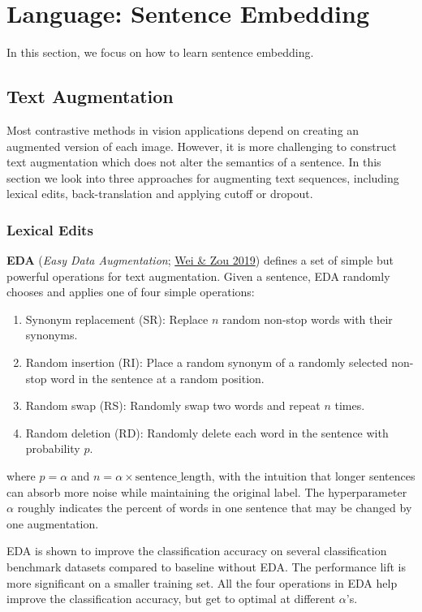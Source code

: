 \documentclass[12pt]{article}
\begin{document}
\section{Language: Sentence Embedding}

In this section, we focus on how to learn sentence embedding.

\subsection{Text Augmentation}

Most contrastive methods in vision applications depend on creating an augmented version of each image. However, it is more challenging to construct text augmentation which does not alter the semantics of a sentence. In this section we look into three approaches for augmenting text sequences, including lexical edits, back-translation and applying cutoff or dropout.

\subsubsection{Lexical Edits}
\textbf{EDA} (\emph{Easy Data Augmentation}; \href{https://arxiv.org/abs/1901.11196}{Wei \& Zou 2019}) defines a set of simple but powerful operations for text augmentation. Given a sentence, EDA randomly chooses and applies one of four simple operations:
\begin{enumerate}
    \item Synonym replacement (SR): Replace $n$ random non-stop words with their synonyms.
    \item Random insertion (RI): Place a random synonym of a randomly selected non-stop word in the sentence at a random position.
    \item Random swap (RS): Randomly swap two words and repeat $n$ times.
    \item Random deletion (RD): Randomly delete each word in the sentence with probability $p$.
\end{enumerate}
where $p=\alpha$ and $n=\alpha \times \text{sentence\_length}$, with the intuition that longer sentences can absorb more noise while maintaining the original label. The hyperparameter $\alpha$ roughly indicates the percent of words in one sentence that may be changed by one augmentation.

EDA is shown to improve the classification accuracy on several classification benchmark datasets compared to baseline without EDA. The performance lift is more significant on a smaller training set. All the four operations in EDA help improve the classification accuracy, but get to optimal at different $\alpha$'s.
\end{document}
